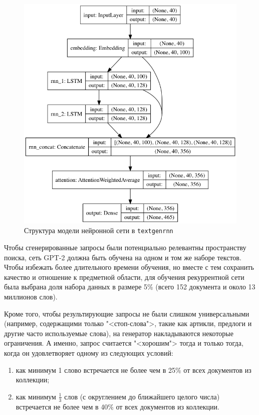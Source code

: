 \begin{figure}
    \centerline{\includegraphics[scale=0.5]{default_model.png}}
    \caption{Структура модели нейронной сети в \texttt{textgenrnn}}\label{fig:default}
\end{figure}

Чтобы сгенерированные запросы были потенциально релевантны пространству поиска, сеть GPT-2 должна быть обучена на одном и том же
наборе текстов. Чтобы избежать более длительного времени обучения, но вместе с тем сохранить качество и отношение к предметной области,
для обучения рекуррентной сети была выбрана доля набора данных в размере 5\% (всего 152 документа и около 13 миллионов слов).

Кроме того, чтобы результирующие запросы не были слишком универсальными (например, содержащими только "<стоп-слова">, такие как
артикли, предлоги и другие часто используемые слова), на генератор накладываются некоторые ограничения. А именно, запрос считается
"<хорошим"> тогда и только тогда, когда он удовлетворяет одному из следующих условий:

\begin{enumerate}[1)]
    \item как минимум 1 слово встречается не более чем в 25\% от всех документов из коллекции;
    \item как минимум \(\frac{1}{3}\) слов (с округлением до ближайшего целого числа) встречается
    не более чем в 40\% от всех документов из коллекции.
\end{enumerate}

